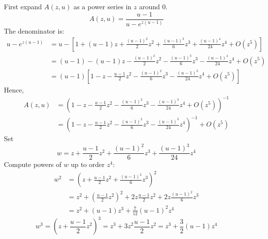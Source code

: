 First expand $A(z, u)$ as a power series in $z$ around $0$.
\begin{equation*}
    A(z, u) = \frac{u - 1}{u - e^{z(u - 1)}}
\end{equation*}
The denominator is:
\begin{equation*}
    \begin{aligned}
        u - e^{z(u - 1)}
        &= u - \left[1 + (u - 1)z + \frac{(u - 1)^{2}}{2}z^{2} + \frac{(u - 1)^{3}}{6}z^{3} + \frac{(u - 1)^{4}}{24}z^{4} + O(z^{5})\right] \\
        &= (u - 1) - (u - 1)z - \frac{(u - 1)^{2}}{2}z^{2} - \frac{(u - 1)^{3}}{6}z^{3} - \frac{(u - 1)^{4}}{24}z^{4} + O(z^{5}) \\
        &= (u - 1)\left[1 - z - \frac{u - 1}{2} z^{2} - \frac{(u - 1)^{2}}{6}z^{3} - \frac{(u - 1)^{3}}{24}z^{4} + O(z^{5})\right]
    \end{aligned}
\end{equation*}
Hence,
\begin{equation*}
    \begin{aligned}
        A(z, u)
        &= \left(1 - z - \frac{u - 1}{2} z^{2} - \frac{(u - 1)^{2}}{6}z^{3} - \frac{(u - 1)^{3}}{24}z^{4} + O(z^{5})\right)^{-1} \\
        &= \left(1 - z - \frac{u - 1}{2} z^{2} - \frac{(u - 1)^{2}}{6}z^{3} - \frac{(u - 1)^{3}}{24}z^{4}\right)^{-1} + O(z^{5})
    \end{aligned}
\end{equation*}
Set
\begin{equation*}
    w = z + \frac{u - 1}{2} z^{2} + \frac{(u - 1)^{2}}{6}z^{3} + \frac{(u - 1)^{3}}{24}z^{4}
\end{equation*}
Compute powers of $w$ up to order $z^{4}$:
\begin{equation*}
    \begin{aligned}
        w^{2}
        &= \left(z + \frac{u - 1}{2} z^{2} + \frac{(u - 1)^{2}}{6}z^{3}\right)^{2} \\
        &= z^{2} + \left(\frac{u - 1}{2} z^{2}\right)^{2} + 2z \frac{u - 1}{2} z^{2} + 2z \frac{(u - 1)^{2}}{6}z^{3} \\
        &= z^{2} + (u - 1)z^{3} + \frac{7}{12}(u - 1)^{2}z^{4}
    \end{aligned}
\end{equation*}
\begin{equation*}
    w^{3} = \left(z + \frac{u - 1}{2} z^{2}\right)^{3} = z^{3} + 3z^{2} \frac{u - 1}{2} z^{2} = z^{3} + \frac{3}{2}(u - 1)z^{4}
\end{equation*}
